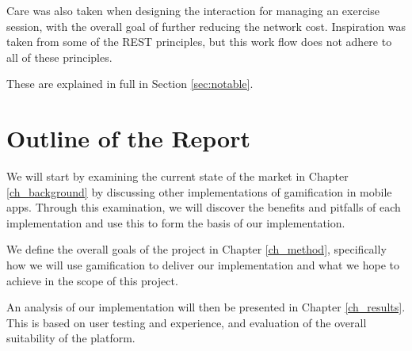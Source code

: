 Care was also taken when designing the interaction for managing an
exercise session, with the overall goal of further reducing the
network cost. Inspiration was taken from some of the REST principles,
but this work flow does not adhere to all of these principles. 

These are explained in full in Section \ref{sec:notable}.

\section{Outline of the Report}

We will start by examining the current state of the market in Chapter
\ref{ch_background} by
discussing other implementations of gamification in mobile
apps. Through this examination, we will discover the benefits and
pitfalls of each implementation and use this to form the basis of our
implementation. 

We define the overall goals of the project in Chapter \ref{ch_method},
specifically how we will use gamification to deliver our
implementation and what we hope to achieve in the scope of this
project.

An analysis of our implementation will then be presented in Chapter
\ref{ch_results}. This is based on user testing and experience, and evaluation of the
overall suitability of the platform.

